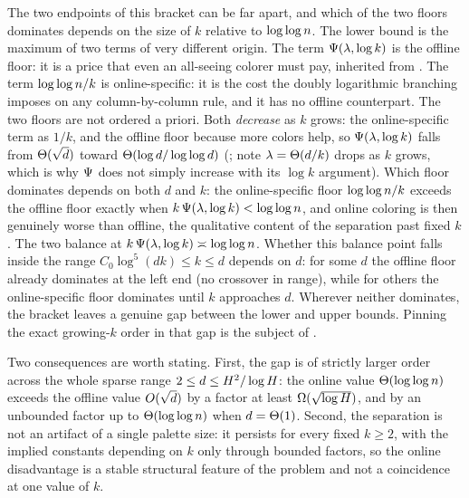 The two endpoints of this bracket can be far apart, and which of the two floors dominates depends on the size of $k$
relative to $\log\log n$. The lower bound is the maximum of two terms of very different origin. The term $\Psi(\lambda,\log k)$
is the offline floor: it is a price that even an all-seeing colorer must pay, inherited from . The term
$\log\log n/k$ is online-specific: it is the cost the doubly logarithmic branching imposes on any column-by-column rule, and
it has no offline counterpart. The two floors are not ordered a priori. Both \emph{decrease} as $k$ grows: the online-specific term as $1/k$, and the
offline floor because more colors help, so $\Psi(\lambda,\log k)$ falls from $\Theta(\sqrt d)$ toward $\Theta(\log d/\log\log d)$
(; note $\lambda=\Theta(d/k)$ drops as $k$ grows, which is why $\Psi$ does not simply increase with its
$\log k$ argument). Which floor dominates depends on both $d$ and $k$: the online-specific floor $\log\log n/k$ exceeds the
offline floor exactly when $k\,\Psi(\lambda,\log k)<\log\log n$, and online coloring is then genuinely worse than offline, the
qualitative content of the separation past fixed $k$. The two balance at $k\,\Psi(\lambda,\log k)\asymp\log\log n$. Whether
this balance point falls inside the range $C_0\log^5(dk)\le k\le d$ depends on $d$: for some $d$ the offline floor already
dominates at the left end (no crossover in range), while for others the online-specific floor dominates until $k$ approaches
$d$. Wherever neither dominates, the bracket leaves a genuine gap
between the lower and upper bounds. Pinning the exact growing-$k$ order in that gap is the subject of .

Two consequences are worth stating. First, the gap is of strictly larger order across the whole sparse range
$2\le d\le H^2/\log H$: the online value $\Theta(\log\log n)$ exceeds the offline value $O(\sqrt d)$ by a factor at
least $\Omega(\sqrt{\log H})$, and by an unbounded factor up to $\Theta(\log\log n)$ when $d=\Theta(1)$. Second, the separation is
not an artifact of a single palette size: it persists for every fixed $k\ge2$, with the implied constants depending on $k$
only through bounded factors, so the online disadvantage is a stable structural feature of the problem and not a coincidence
at one value of $k$.
